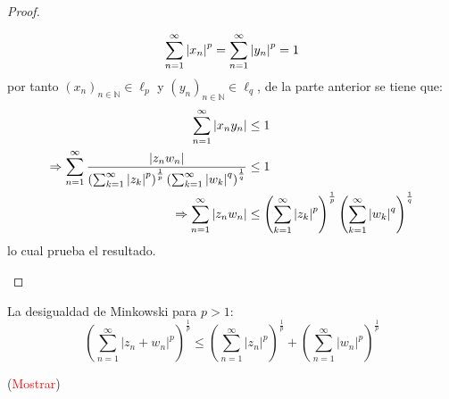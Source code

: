 \documentclass[twoside,12pt,a4 paper,openright]{book}
\begin{document}
\begin{enumerate}
\begin{proof}
\begin{enumerate}
\begin{equation*}
                \sum_{ n=1}^\infty\left|x_n\right|^p=\sum_{ n=1}^\infty\left|y_n\right|^p=1
            \end{equation*}
            por tanto $(x_n)_{n\in\mathbb{N}}\in\ell_p$ y $(y_n)_{n\in\mathbb{N}}\in\ell_q$, de la parte anterior se tiene que:
            \begin{equation*}
                \begin{split}
                    \sum_{ n=1}^\infty\left|x_ny_n\right|&\leq1\\
                    \Rightarrow\sum_{ n=1}^\infty\frac{\left|z_nw_n\right|}{\left(\sum_{ k=1}^\infty\left|z_k\right|^p\right)^{\frac{1}{p}}\left(\sum_{ k=1}^\infty\left|w_k\right|^q\right)^{\frac{1}{q}}}&\leq1\\
                    \Rightarrow \sum_{ n=1}^\infty\left|z_nw_n\right|&\leq\left(\sum_{ k=1}^\infty\left|z_k\right|^p\right)^{\frac{1}{p}}\left(\sum_{ k=1}^\infty\left|w_k\right|^q\right)^{\frac{1}{q}}\\
                \end{split}
            \end{equation*}
            lo cual prueba el resultado.
        \end{enumerate}
    \end{proof}

    La desigualdad de Minkowski para $p>1$:
    \begin{equation*}
        \left(\sum_{n=1}^{ \infty} |z_n+w_n|^{p} \right)^{\frac{1}{p}}\leq   \left( \sum_{n=1}^{ \infty} |z_n|^{p}\right) ^{\frac{1}{p}} + \left(\sum_{n=1}^{ \infty} |w_n|^{p}\right) ^{\frac{1}{p}}
    \end{equation*}

    (\textcolor{red}{Mostrar})


\end{enumerate}
\end{document}
